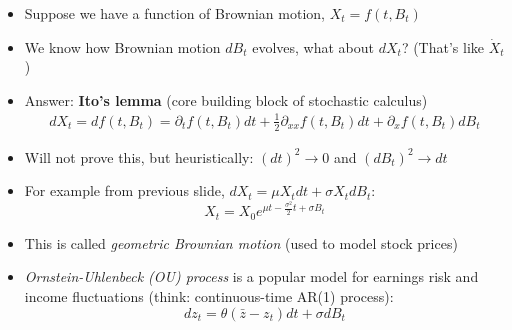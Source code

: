 \documentclass[10pt]{beamer}
\begin{document}
\begin{frame}{}

{\small
\begin{itemize}
\item Suppose we have a function of Brownian motion, $X_t = f(t, B_t)$

\item We know how Brownian motion $dB_t$ evolves, what about $dX_t$? (That's like $\dot X_t$)

\item Answer: \textbf{Ito's lemma} (core building block of stochastic calculus)
\begin{align*}
	dX_t = d f(t, B_t)  = \partial_t f(t, B_t) dt + \frac{1}{2} \partial_{xx} f(t, B_t) dt + \partial_x f(t, B_t) dB_t
\end{align*}

\item Will not prove this, but heuristically: $(dt)^2 \to 0$ and $(dB_t)^2 \to dt$

\item For example from previous slide, $dX_t = \mu X_t dt + \sigma X_t dB_t$:
\begin{equation*}
	X_t = X_0 e^{\mu t - \frac{\sigma^2}{2} t + \sigma B_t}
\end{equation*}

\item This is called \textit{geometric Brownian motion} (used to model stock prices)

\item \textit{Ornstein-Uhlenbeck (OU) process} is a popular model for earnings risk and income fluctuations (think: continuous-time AR(1) process):
\begin{equation*}
	dz_t = \theta(\bar z - z_t) dt + \sigma dB_t
\end{equation*}
\end{itemize}
}
\end{frame}
\end{document}
